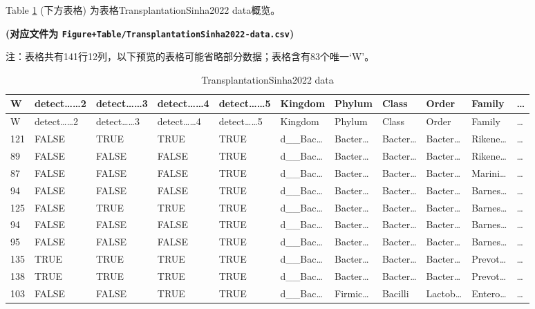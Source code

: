 \documentclass[
]{article}
\begin{document}
Table \ref{tab:TransplantationSinha2022-data} (下方表格) 为表格TransplantationSinha2022 data概览。

\textbf{(对应文件为 \texttt{Figure+Table/TransplantationSinha2022-data.csv})}

\begin{center}\begin{tcolorbox}[colback=gray!10, colframe=gray!50, width=0.9\linewidth, arc=1mm, boxrule=0.5pt]注：表格共有141行12列，以下预览的表格可能省略部分数据；表格含有83个唯一`W'。
\end{tcolorbox}
\end{center}

\begin{longtable}[]{@{}lllllllllll@{}}
\caption{\label{tab:TransplantationSinha2022-data}TransplantationSinha2022 data}\tabularnewline
\toprule
W & detect\ldots\ldots2 & detect\ldots\ldots3 & detect\ldots\ldots4 & detect\ldots\ldots5 & Kingdom & Phylum & Class & Order & Family & \ldots{}\tabularnewline
\midrule
\endfirsthead
\toprule
W & detect\ldots\ldots2 & detect\ldots\ldots3 & detect\ldots\ldots4 & detect\ldots\ldots5 & Kingdom & Phylum & Class & Order & Family & \ldots{}\tabularnewline
\midrule
\endhead
121 & FALSE & TRUE & TRUE & TRUE & d\_\_Bac\ldots{} & Bacter\ldots{} & Bacter\ldots{} & Bacter\ldots{} & Rikene\ldots{} & \ldots{}\tabularnewline
89 & FALSE & FALSE & FALSE & TRUE & d\_\_Bac\ldots{} & Bacter\ldots{} & Bacter\ldots{} & Bacter\ldots{} & Rikene\ldots{} & \ldots{}\tabularnewline
87 & FALSE & FALSE & FALSE & TRUE & d\_\_Bac\ldots{} & Bacter\ldots{} & Bacter\ldots{} & Bacter\ldots{} & Marini\ldots{} & \ldots{}\tabularnewline
94 & FALSE & FALSE & FALSE & TRUE & d\_\_Bac\ldots{} & Bacter\ldots{} & Bacter\ldots{} & Bacter\ldots{} & Barnes\ldots{} & \ldots{}\tabularnewline
125 & FALSE & TRUE & TRUE & TRUE & d\_\_Bac\ldots{} & Bacter\ldots{} & Bacter\ldots{} & Bacter\ldots{} & Barnes\ldots{} & \ldots{}\tabularnewline
94 & FALSE & FALSE & FALSE & TRUE & d\_\_Bac\ldots{} & Bacter\ldots{} & Bacter\ldots{} & Bacter\ldots{} & Barnes\ldots{} & \ldots{}\tabularnewline
95 & FALSE & FALSE & FALSE & TRUE & d\_\_Bac\ldots{} & Bacter\ldots{} & Bacter\ldots{} & Bacter\ldots{} & Barnes\ldots{} & \ldots{}\tabularnewline
135 & TRUE & TRUE & TRUE & TRUE & d\_\_Bac\ldots{} & Bacter\ldots{} & Bacter\ldots{} & Bacter\ldots{} & Prevot\ldots{} & \ldots{}\tabularnewline
138 & TRUE & TRUE & TRUE & TRUE & d\_\_Bac\ldots{} & Bacter\ldots{} & Bacter\ldots{} & Bacter\ldots{} & Prevot\ldots{} & \ldots{}\tabularnewline
103 & FALSE & FALSE & TRUE & TRUE & d\_\_Bac\ldots{} & Firmic\ldots{} & Bacilli & Lactob\ldots{} & Entero\ldots{} & \ldots{}\tabularnewline

\end{longtable}
\end{document}
